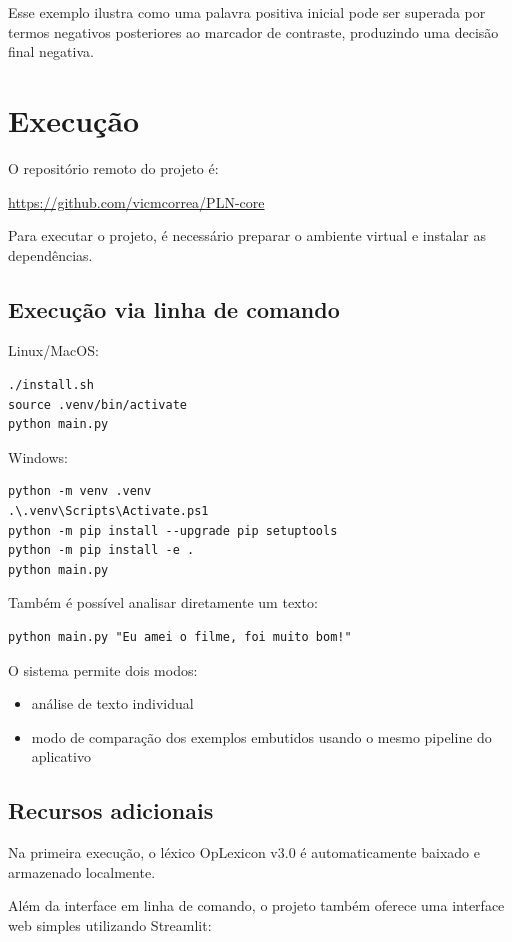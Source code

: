 \documentclass[11pt,a4paper]{article}
\begin{document}
Esse exemplo ilustra como uma palavra positiva inicial pode ser superada por termos negativos posteriores ao marcador de contraste, produzindo uma decisão final negativa.

\section{Execução}

O repositório remoto do projeto é:

\url{https://github.com/vicmcorrea/PLN-core}

Para executar o projeto, é necessário preparar o ambiente virtual e instalar as dependências.

\subsection*{Execução via linha de comando}

Linux/MacOS:
\begin{verbatim}
./install.sh
source .venv/bin/activate
python main.py
\end{verbatim}

Windows:
\begin{verbatim}
python -m venv .venv
.\.venv\Scripts\Activate.ps1
python -m pip install --upgrade pip setuptools
python -m pip install -e .
python main.py
\end{verbatim}

Também é possível analisar diretamente um texto:

\begin{verbatim}
python main.py "Eu amei o filme, foi muito bom!"
\end{verbatim}

O sistema permite dois modos:
\begin{itemize}
  \item análise de texto individual
  \item modo de comparação dos exemplos embutidos usando o mesmo pipeline do aplicativo
\end{itemize}

\subsection*{Recursos adicionais}

Na primeira execução, o léxico OpLexicon v3.0 é automaticamente baixado e armazenado localmente.

Além da interface em linha de comando, o projeto também oferece uma interface web simples utilizando Streamlit:
\end{document}
